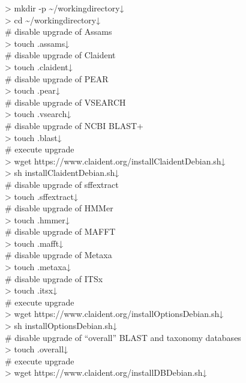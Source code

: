 \documentclass[titlepage,10pt,a4paper,english]{jsbook}
\newenvironment{cmd}{\begin{oframed}\raggedright\ttfamily\footnotesize\setlength{\baselineskip}{1.4em}}{\end{oframed}\vspace{-1em}}
\begin{document}
\begin{cmd}
{\textgreater} mkdir -p {\textasciitilde}/workingdirectory↓\\
{\textgreater} cd {\textasciitilde}/workingdirectory↓\\
\# disable upgrade of Assams\\
{\textgreater} touch .assams↓\\
\# disable upgrade of Claident\\
{\textgreater} touch .claident↓\\
\# disable upgrade of PEAR\\
{\textgreater} touch .pear↓\\
\# disable upgrade of VSEARCH\\
{\textgreater} touch .vsearch↓\\
\# disable upgrade of NCBI BLAST+\\
{\textgreater} touch .blast↓\\
\# execute upgrade\\
{\textgreater} wget https://www.claident.org/installClaident{\textunderscore}Debian.sh↓\\
{\textgreater} sh installClaident{\textunderscore}Debian.sh↓\\
\# disable upgrade of sff{\textunderscore}extract\\
{\textgreater} touch .sffextract↓\\
\# disable upgrade of HMMer\\
{\textgreater} touch .hmmer↓\\
\# disable upgrade of MAFFT\\
{\textgreater} touch .mafft↓\\
\# disable upgrade of Metaxa\\
{\textgreater} touch .metaxa↓\\
\# disable upgrade of ITSx\\
{\textgreater} touch .itsx↓\\
\# execute upgrade\\
{\textgreater} wget https://www.claident.org/installOptions{\textunderscore}Debian.sh↓\\
{\textgreater} sh installOptions{\textunderscore}Debian.sh↓\\
\# disable upgrade of ``overall'' BLAST and taxonomy databases\\
{\textgreater} touch .overall↓\\
\# execute upgrade\\
{\textgreater} wget https://www.claident.org/installDB{\textunderscore}Debian.sh↓\\

\end{cmd}
\end{document}
